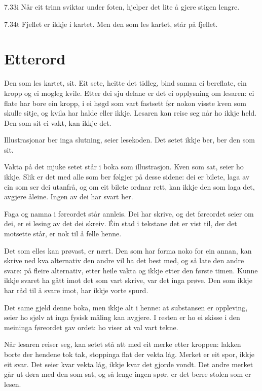 \begin{formproposition}{7.33}{i}
Når eit trinn sviktar under foten, hjelper det lite å gjere stigen lengre.
\end{formproposition}

\begin{formproposition}{7.34}{t}
Fjellet er ikkje i kartet. Men den som les kartet, står på fjellet.
\end{formproposition}

\section{Etterord}

Den som les kartet, sit. Eit sete, heitte det tidleg, bind saman ei bereflate, ein kropp og ei mogleg kvile. Etter dei sju delane er det ei opplysning om lesaren: ei flate har bore ein kropp, i ei høgd som vart fastsett før nokon visste kven som skulle sitje, og kvila har halde eller ikkje. Lesaren kan reise seg når ho ikkje held. Den som sit ei vakt, kan ikkje det.

Illustrasjonar ber inga slutning, seier lesekoden. Det setet ikkje ber, ber den som sit.

Vakta på det mjuke setet står i boka som illustrasjon. Kven som sat, seier ho ikkje. Slik er det med alle som ber følgjer på desse sidene: dei er bilete, laga av ein som ser dei utanfrå, og om eit bilete ordnar rett, kan ikkje den som laga det, avgjere åleine. Ingen av dei har svart her.

Faga og namna i føreordet står annleis. Dei har skrive, og det føreordet seier om dei, er ei lesing av det dei skreiv. Éin stad i tekstane det er vist til, der det motsette står, er nok til å felle henne.

Det som elles kan prøvast, er nært. Den som har forma noko for ein annan, kan skrive ned kva alternativ den andre vil ha det best med, og så late den andre svare: på fleire alternativ, etter heile vakta og ikkje etter den første timen. Kunne ikkje svaret ha gått imot det som vart skrive, var det inga prøve. Den som ikkje har råd til å svare imot, har ikkje vorte spurd.

Det same gjeld denne boka, men ikkje alt i henne: at substansen er oppleving, seier ho sjølv at inga fysisk måling kan avgjere. I resten er ho ei skisse i den meininga føreordet gav ordet: ho viser at val vart tekne.

Når lesaren reiser seg, kan setet stå att med eit merke etter kroppen: lakken borte der hendene tok tak, stoppinga flat der vekta låg. Merket er eit spor, ikkje eit svar. Det seier kvar vekta låg, ikkje kvar det gjorde vondt. Det andre merket går ut døra med den som sat, og så lenge ingen spør, er det berre stolen som er lesen.
